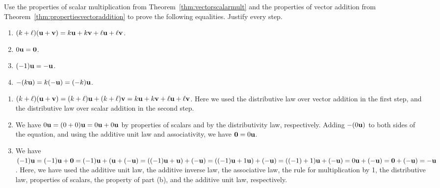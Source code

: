 \begin{enumialphparenastyle}
\begin{ex}
  Use the properties of scalar multiplication from
  Theorem~\ref{thm:vectorscalarmult} and the properties of vector
  addition from Theorem~\ref{thm:propertiesvectoraddition} to prove
  the following equalities. Justify every step.
  \begin{enumerate}
  \item $(k+\ell)(\mbox{\bf u}+\mbox{\bf v}) = k\mbox{\bf u} + k\mbox{\bf v} +
    \ell\mbox{\bf u} + \ell\mbox{\bf v}$.
  \item $0\mbox{\bf u} = \mbox{\bf 0}$.
  \item $(-1)\mbox{\bf u} = -\mbox{\bf u}$.
  \item $-(k\mbox{\bf u}) = k(-\mbox{\bf u}) = (-k)\mbox{\bf u}$.
  \end{enumerate}
  \begin{sol}
    \begin{enumerate}
    \item
      $(k+\ell)(\mbox{\bf u}+\mbox{\bf v}) = (k+\ell)\mbox{\bf u} +
      (k+\ell)\mbox{\bf v} = k\mbox{\bf u} + k\mbox{\bf v} + \ell\mbox{\bf u} +
      \ell\mbox{\bf v}$. Here we used the distributive law over vector
      addition in the first step, and the distributive law over scalar
      addition in the second step.
    \item We have $0\mbox{\bf u} = (0+0)\mbox{\bf u} = 0\mbox{\bf u} + 0\mbox{\bf u}$
      by properties of scalars and by the distributivity law,
      respectively. Adding $-(0\mbox{\bf u})$ to both sides of the
      equation, and using the additive unit law and associativity, we
      have $\mbox{\bf 0} = 0\mbox{\bf u}$.
    \item We have $(-1)\mbox{\bf u} = (-1)\mbox{\bf u} + \mbox{\bf 0} =
      (-1)\mbox{\bf u} + (\mbox{\bf u} + (-\mbox{\bf u}) = ((-1)\mbox{\bf u} +
      \mbox{\bf u}) + (-\mbox{\bf u}) = ((-1)\mbox{\bf u} + 1\mbox{\bf u}) +
      (-\mbox{\bf u}) = ((-1)+1)\mbox{\bf u} + (-\mbox{\bf u}) = 0\mbox{\bf u} +
      (-\mbox{\bf u}) = \mbox{\bf 0} + (-\mbox{\bf u}) = -\mbox{\bf u}$. Here, we have
      used the additive unit law, the additive inverse law, the
      associative law, the rule for multiplication by 1, the
      distributive law, properties of scalars, the property of part
      (b), and the additive unit law, respectively.
    \end{enumerate}
  \end{sol}
\end{ex}


\end{enumialphparenastyle}
